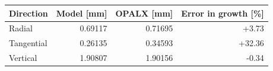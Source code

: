 \begin{tabular}{lrrr}
\toprule
Direction & Model [mm] & OPALX [mm] & Error in growth [\%] \\
\midrule
Radial & 0.69117 & 0.71695 & +3.73 \\
Tangential & 0.26135 & 0.34593 & +32.36 \\
Vertical & 1.90807 & 1.90156 & -0.34 \\
\bottomrule
\end{tabular}
